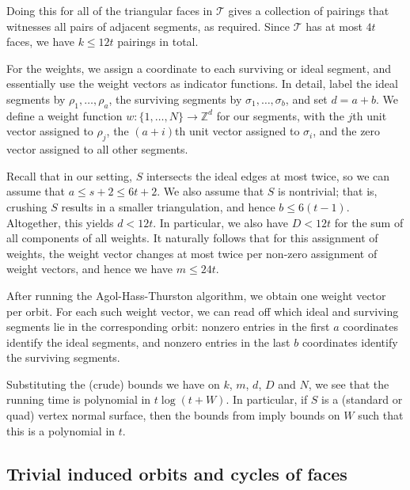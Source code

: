 \documentclass[10pt,a4paper]{amsart}
\newcommand{\tri}{\mathcal{T}}
\begin{document}
Doing this for all of the triangular faces in $\tri$ gives a collection of pairings that witnesses all pairs of adjacent segments, as required.
Since $\tri$ has at most $4t$ faces, we have $k \leqslant 12t$ pairings in total.

For the weights, we assign a coordinate to each surviving or ideal segment, and essentially use the weight vectors as indicator functions.
In detail, label the ideal segments by $\rho_1,\ldots,\rho_{a}$, the surviving segments by $\sigma_1,\ldots,\sigma_{b}$, and set $d = a + b$.
We define a weight function $w: \{ 1, \ldots , N\} \to \mathbb{Z}^d$ for our segments, with the $j$th unit vector assigned to $\rho_j$, the $(a+i)$th unit vector assigned to $\sigma_i$, and the zero vector assigned to all other segments.

Recall that in our setting, $S$ intersects the ideal edges at most twice, so we can assume that $a \leqslant s + 2 \leqslant 6t + 2$.
We also assume that $S$ is nontrivial;
that is, crushing $S$ results in a smaller triangulation, and hence $b \leqslant 6(t-1)$.
Altogether, this yields $d < 12t$. In particular, we also have $D < 12t$ for the sum of all components of all weights.
It naturally follows that for this assignment of weights, the weight vector changes at most twice per non-zero assignment of weight vectors, and hence we have $m \leqslant 24t$.

After running the Agol-Hass-Thurston algorithm, we obtain one weight vector per orbit.
For each such weight vector, we can read off which ideal and surviving segments lie in the corresponding orbit:
nonzero entries in the first $a$ coordinates identify the ideal segments, and nonzero entries in the last $b$ coordinates identify the surviving segments.

Substituting the (crude) bounds we have on $k$, $m$, $d$, $D$ and $N$, we see that the running time is polynomial in $t\log(t+W)$. In particular, if $S$ is a (standard or quad) vertex normal surface, then the bounds from \cite{hass1999computational} imply bounds on $W$ such that this is a polynomial in $t$.

\subsection{Trivial induced orbits and cycles of faces}\label{ssec:trivialInducedOrbit}
\end{document}
